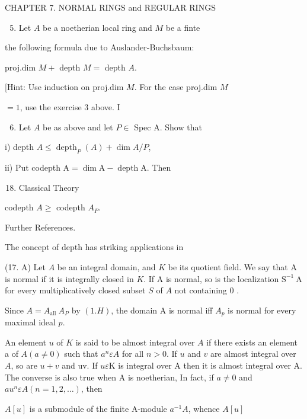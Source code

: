 CHAPTER 7. NORMAL RINGS and REGULAR RINGS

\begin{enumerate}
  \setcounter{enumi}{4}
  \item Let $A$ be a noetherian local ring and $M$ be a finte
\end{enumerate}
the following formula due to Auslander-Buchsbaum:

proj.dim $M+$ depth $M=$ depth $A$.

[Hint: Use induction on proj.dim $M$. For the case proj.dim $M$

$=1$, use the exercise 3 above. I

\begin{enumerate}
  \setcounter{enumi}{5}
  \item Let $A$ be as above and let $P \in$ Spec A. Show that
\end{enumerate}
i) depth $A \leqslant \operatorname{depth}_{P}(A)+\operatorname{dim} A / P$,

ii) Put codepth $\mathrm{A}=\operatorname{dim} \mathrm{A}-\operatorname{depth} \mathrm{A}$. Then

\begin{enumerate}
  \setcounter{enumi}{17}
  \item Classical Theory
\end{enumerate}
codepth $A \geqslant$ codepth $A_{P}$.

Further References.

The concept of depth has striking applications in

(17. A) Let $A$ be an integral domain, and $K$ be its quotient field. We say that A is normal if it is integrally closed in $K$. If A is normal, so is the localization $\mathrm{S}^{-1} \mathrm{~A}$ for every multiplicatively closed subset $S$ of $A$ not containing 0 .

Since $A=A_{\text {all }} A_{P}$ by $(1 . H)$, the domain A is normal iff $A_{p}$ is normal for every maximal ideal $p$.

An element $u$ of $K$ is said to be almost integral over $A$ if there exists an element a of $A(a \neq 0)$ such that $a^{n} \varepsilon A$ for all $n>0$. If $u$ and $v$ are almost integral over $A$, so are $u+v$ and uv. If $u \varepsilon \mathrm{K}$ is integral over A then it is almost integral over A. The converse is also true when A is noetherian, In fact, if $a \neq 0$ and $a u^{n} \varepsilon A(n=1,2, \ldots)$, then

$A[u]$ is a submodule of the finite A-module $a^{-1} A$, whence $A[u]$

